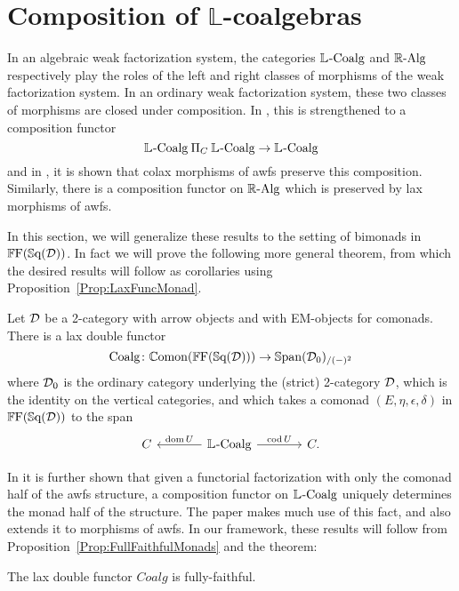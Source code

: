
\chapter{Composition of $\mathbb{L}$-coalgebras}

In an algebraic weak factorization system, the categories $\mathbb{L}_{}\text{-}\mathrm{Coalg}$ and $\mathbb{R}\text{-}\mathrm{Alg}$ respectively play the roles of the left and right classes of morphisms of the weak factorization system. In an ordinary weak factorization system, these two classes of morphisms are closed under composition. In \cite{garner:soa}, this is strengthened to a composition functor
\[
	\mathbb{L}_{}\text{-}\mathrm{Coalg} \mathbin{\Pi}_C \mathbb{L}_{}\text{-}\mathrm{Coalg} \to \mathbb{L}_{}\text{-}\mathrm{Coalg}
\]
and in \cite{riehl:nwfs-model}, it is shown that colax morphisms of awfs preserve this composition. Similarly, there is a composition functor on $\mathbb{R}\text{-}\mathrm{Alg}$ which is preserved by lax morphisms of awfs.

In this section, we will generalize these results to the setting of bimonads in $\mathbb{F}\mathrm{F}(\mathbb{S}\mathrm{q}(\mathcal{D}))$. In fact we will prove the following more general theorem, from which the desired results will follow as corollaries using Proposition~\ref{Prop:LaxFuncMonad}.

\begin{theorem}\label{Thm:CoalgLaxFunctor}
	Let $\mathcal{D}$ be a 2-category with arrow objects and with EM-objects for comonads.
	There is a lax double functor
	\[
		\mathrm{Coalg}\colon \mathbb{C}\mathrm{omon}(\mathbb{F}\mathrm{F}(\mathbb{S}\mathrm{q}(\mathcal{D}))) \to \mathbb{S}\mathrm{pan}(\mathcal{D}_0)_{/(-)^2}
	\] 
	where $\mathcal{D}_0$ is the ordinary category underlying the (strict) 2-category $\mathcal{D}$, which is the identity on the vertical categories, and which takes a comonad $(E,\eta,\epsilon,\delta)$ in $\mathbb{F}\mathrm{F}(\mathbb{S}\mathrm{q}(\mathcal{D}))$ to the span
	\[
	\begin{tikzcd}[column sep=large]
		C & \LCoalg \lar[swap]{\dom U} \rar{\cod U} & C.
	\end{tikzcd}
	\]
\end{theorem}

In \cite{garner:soa} it is further shown that given a functorial factorization with only the comonad half of the awfs structure, a composition functor on $\mathbb{L}_{}\text{-}\mathrm{Coalg}$ uniquely determines the monad half of the structure. The paper \cite{riehl:nwfs-model} makes much use of this fact, and also extends it to morphisms of awfs. In our framework, these results will follow from Proposition~\ref{Prop:FullFaithfulMonads} and the theorem:

\begin{theorem}\label{Thm:CoalgFullFaithful}
	The lax double functor $Coalg$ is fully-faithful.
\end{theorem}

